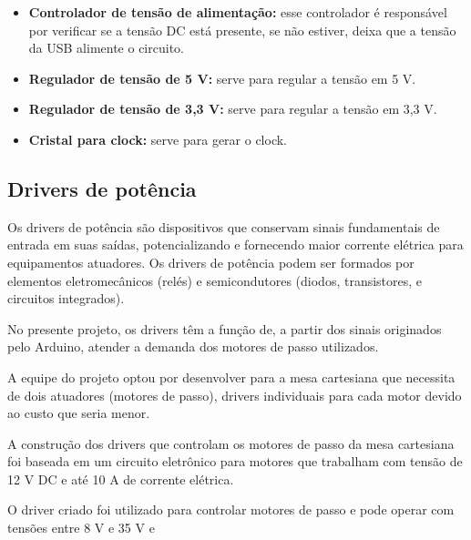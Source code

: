 \begin{itemize}
\item \textbf{Controlador de tensão de alimentação:} esse controlador é responsável por verificar se a tensão DC está presente, se não estiver, deixa que a tensão da USB alimente o circuito. 
\item \textbf{Regulador de tensão de 5 V:} serve para regular a tensão em 5 V.
\item \textbf{Regulador de tensão de 3,3 V:} serve para regular a tensão em 3,3 V.
\item \textbf{Cristal para clock:} serve para gerar o clock.
\end{itemize}

\subsection{Drivers de potência}\label{subsec:metdriver}

Os drivers de potência são dispositivos que conservam sinais fundamentais de entrada em suas saídas, 
potencializando e fornecendo maior corrente elétrica para equipamentos atuadores. Os drivers de potência 
podem ser formados por elementos eletromecânicos (relés) e semicondutores (diodos, transistores, e 
circuitos integrados). 

No presente projeto, os drivers têm a função de, a partir dos sinais originados pelo Arduino, atender 
a demanda dos motores de passo utilizados.

A equipe do projeto optou por desenvolver para a mesa cartesiana que necessita de dois atuadores 
(motores de passo), drivers individuais para cada motor devido ao custo que seria menor.

A construção dos drivers que controlam os motores de passo da mesa cartesiana foi baseada em um 
circuito eletrônico para motores que trabalham com tensão de 12 V DC e até 10 A de corrente elétrica. 

    
O driver criado foi utilizado para controlar motores de passo e pode operar com tensões entre 8 V e 35 V e 

    
